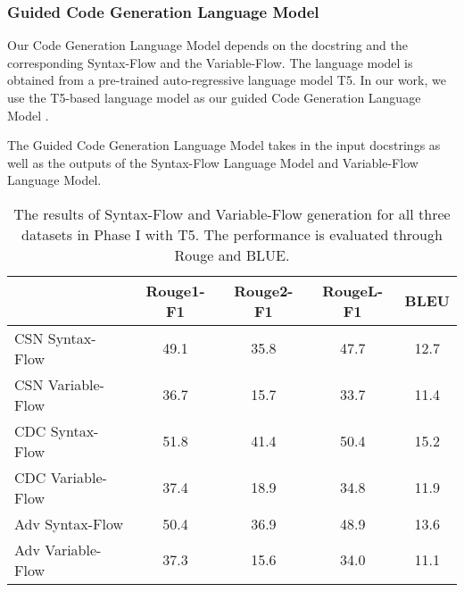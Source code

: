 \documentclass[11pt]{article}
\begin{document}
\subsubsection{Guided Code Generation Language Model} 

Our Code Generation Language Model depends on the docstring and the corresponding Syntax-Flow and the Variable-Flow. The language model is obtained from a pre-trained auto-regressive language model T5. In our work, we use the T5-based language model as our guided Code Generation Language Model .

The Guided Code Generation Language Model takes in the input docstrings  as well as the outputs of the Syntax-Flow Language Model and Variable-Flow Language Model. 


\begin{table*}[ht]
\centering
\begin{tabular}{|l|c|c|c|c|}
\hline
                 & Rouge1-F1                    & Rouge2-F1                   & RougeL-F1   & BLEU  \\ \hline
CSN Syntax-Flow   & 49.1                      & 35.8                          & 47.7    & 12.7 \\ 
CSN Variable-Flow & 36.7                        & 15.7                        & 33.7    & 11.4 \\ \hline
CDC Syntax-Flow   & 51.8                       & 41.4                         & 50.4    & 15.2 \\ 
CDC Variable-Flow & 37.4                        & 18.9                        & 34.8    & 11.9 \\ \hline
Adv Syntax-Flow   & 50.4                        & 36.9                        & 48.9    & 13.6 \\ 
Adv Variable-Flow & 37.3                        & 15.6                        & 34.0    & 11.1 \\ \hline  
\end{tabular}
\caption{The results of Syntax-Flow and Variable-Flow generation for all three datasets in Phase I with T5. The performance is evaluated through Rouge and BLUE.}
\label{table::phase1}
\end{table*}
\end{document}
